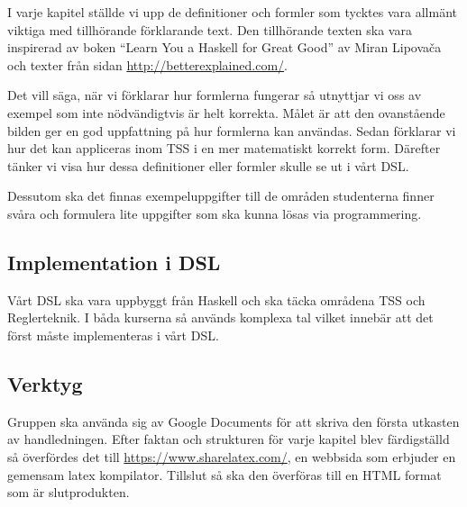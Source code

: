 \documentclass[]{article}
\begin{document}

I varje kapitel ställde vi upp de definitioner och formler som tycktes
vara allmänt viktiga med tillhörande förklarande text. Den tillhörande
texten ska vara inspirerad av boken ``Learn You a Haskell for Great
Good'' av Miran Lipovača \cite{learnyouahaskell} och texter från sidan
\url{http://betterexplained.com/}.

Det vill säga, när vi förklarar hur formlerna fungerar så utnyttjar vi
oss av exempel som inte nödvändigtvis är helt korrekta. Målet är
att den ovanstående bilden ger en god uppfattning på hur formlerna kan användas.
Sedan förklarar vi hur det kan appliceras inom TSS i en mer matematiskt korrekt form.
Därefter tänker vi visa hur dessa definitioner eller formler skulle se ut i vårt DSL.

Dessutom ska det finnas exempeluppgifter till de områden studenterna finner
svåra och formulera lite uppgifter som ska kunna lösas via programmering.

\subsection{Implementation i DSL}

Vårt DSL ska vara uppbyggt från Haskell och ska täcka områdena TSS och Reglerteknik.
I båda kurserna så används komplexa tal vilket innebär att det först måste implementeras i vårt DSL.

\subsection{Verktyg}%
Gruppen ska använda sig av Google Documents för att skriva den första utkasten av handledningen.
Efter faktan och strukturen för varje kapitel blev färdigställd så överfördes det till
\url{https://www.sharelatex.com/}, en webbsida som erbjuder en gemensam latex kompilator.
Tillslut så ska den överföras till en HTML format som är slutprodukten.
\end{document}
